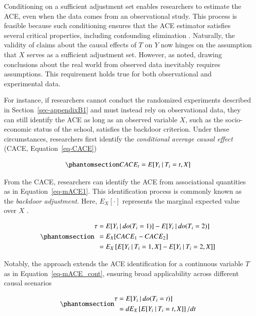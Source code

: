 \documentclass[
  authoryear,
  review,
  1p]{elsarticle}
\begin{document}
Conditioning on a sufficient adjustment set enables researchers to
estimate the ACE, even when the data comes from an observational study.
This process is feasible because such conditioning ensures that the ACE
estimator satisfies several critical properties, including confounding
elimination \citep{Morgan_et_al_2014}. Naturally, the validity of claims
about the causal effects of \(T\) on \(Y\) now hinges on the assumption
that \(X\) serves as a sufficient adjustment set. However, as
\citet[pp.~150]{Kohler_et_al_2019} noted, drawing conclusions about the
real world from observed data inevitably requires assumptions. This
requirement holds true for both observational and experimental data.

For instance, if researchers cannot conduct the randomized experiments
described in Section~\ref{sec-appendixB1} and must instead rely on
observational data, they can still identify the ACE as long as an
observed variable \(X\), such as the socio-economic status of the
school, satisfies the backdoor criterion. Under these circumstances,
researchers first identify the \emph{conditional average causal effect}
(CACE, Equation~\ref{eq-CACE})

\begin{equation}\phantomsection\label{eq-CACE}{
CACE_{t} = E[Y_{i} \:|\:T_{i}=t, X]
}\end{equation}

From the CACE, researchers can identify the ACE from associational
quantities as in Equation~\ref{eq-mACE1}. This identification process is
commonly known as the \emph{backdoor adjustment}. Here, \(E_{X}[\cdot]\)
represents the marginal expected value over \(X\)
\citep{Morgan_et_al_2014}.

\begin{equation}\phantomsection\label{eq-mACE1}{
\begin{aligned}
  \tau & = E[Y_{i} \:|\:do(T_{i}=1)]- E[Y_{i} \:|\:do(T_{i}=2)] \\
  & = E_{X}[CACE_{1} - CACE_{2}] \\
  & = E_{X}\left[ E[Y_{i} \:|\:T_{i}=1, X] - E[Y_{i} \:|\:T_{i}=2, X] \right]
\end{aligned}
}\end{equation}

Notably, the approach extends the ACE identification for a continuous
variable \(T\) as in Equation~\ref{eq-mACE_cont}, ensuring broad
applicability across different causal scenarios
\citep[pp.~45]{Neal_2020}

\begin{equation}\phantomsection\label{eq-mACE_cont}{
\begin{aligned}
  \tau &= E[Y_{i} \:|\:do(T_{i}=t)] \\
  & = d E_{X}\left[ E[Y_{i} \:|\:T_{i}=t, X]\right]/ dt
  \end{aligned}
}\end{equation}
\end{document}
